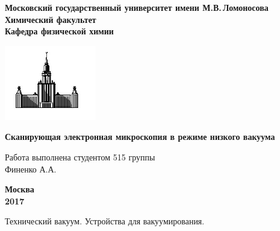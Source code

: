 \documentclass[12pt]{article}
\begin{document}
 

\begin{titlepage}
\centering
\textbf{\large Московский государственный университет имени М.В.\,Ломоносова\\
\vspace*{0.1cm} Химический факультет\\
\vspace*{0.1cm}
\noindent\makebox[\linewidth]{\rule{\paperwidth}{0.4pt}}
\vspace*{0.1cm}
 Кафедра физической химии}
\vspace*{2cm}

\begin{center}
\includegraphics[width=0.3\textwidth]{pictures/logo.jpg}
\end{center}

\vspace*{2cm}
\Large \textbf{Сканирующая электронная микроскопия в режиме низкого вакуума} 
\vspace*{6cm}

\begin{flushright}
\large Работа выполнена студентом 515 группы\\
Финенко А.А.\\
\end{flushright}
\vfill
\large\textbf{Москва\\ 2017}
\end{titlepage}

Технический вакуум. Устройства для вакуумирования. \newline
\end{document}

